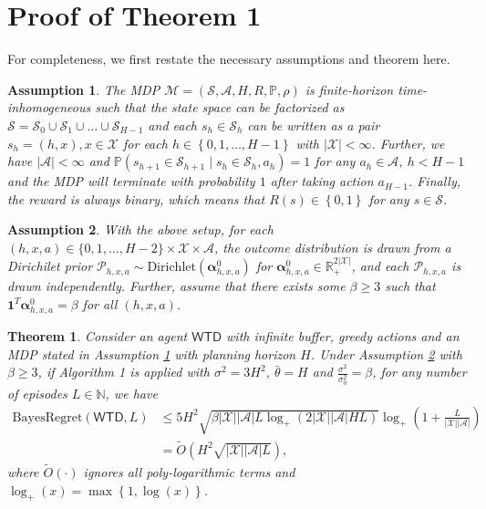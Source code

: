 \documentclass[letterpaper]{article} %
\newcommand{\Sp}[1]{\left(#1\right)}
\newcommand{\Bp}[1]{\left\{#1\right\}}
\newcommand{\abs}[1]{\left|#1\right|}
\newcommand{\Prob}{\mathbb{P}}
\newcommand{\R}{\mathbb{R}}
\newtheorem{theorem}{Theorem}
\newtheorem{assumption}{Assumption}
\theoremstyle{definition}
\begin{document}
\section{Proof of Theorem 1}
For completeness, we first restate the necessary assumptions and theorem here.
\begin{assumption}
    \label{assume:mdp}
    The MDP $\mathcal{M}=\Sp{\mathcal{S}, \mathcal{A}, H, R, \Prob, \rho}$ is finite-horizon time-inhomogeneous such that the state space can be factorized as $\mathcal{S}=\mathcal{S}_0\cup\mathcal{S}_1\cup\dots\cup\mathcal{S}_{H-1}$ and each $s_h\in \mathcal{S}_h$ can be written as a pair $s_h=\Sp{h, x}, x\in\mathcal{X}$ for each $h\in\Bp{0, 1, \dots, H-1}$ with $\abs{\mathcal{X}}<\infty$. Further, we have $\abs{\mathcal{A}}<\infty$ and $\Prob\Sp{s_{h+1}\in\mathcal{S}_{h+1}\mid s_h\in\mathcal{S}_h, a_h}=1$ for any $a_h\in\mathcal{A}$, $h<H-1$ and the MDP will terminate with probability $1$ after taking action $a_{H-1}$. Finally, the reward is always binary, which means that $R\Sp{s}\in\Bp{0, 1}$ for any $s\in\mathcal{S}$.
\end{assumption}
\begin{assumption}
	\label{assume:dir}
	With the above setup, for each $(h, x, a) \in \{0, 1, \dots, H - 2\} \times \mathcal{X} \times \mathcal{A}$, the outcome distribution is drawn from a Dirichilet prior $\mathcal{P}_{h, x, a}\sim\mathrm{Dirichlet}\Sp{\bm{\alpha}^0_{h, x, a}}$ for $\bm{\alpha}^0_{h, x, a} \in \R_{+}^{2 \abs{\mathcal{X}}}$, and each $\mathcal{P}_{h, x, a}$ is drawn independently. Further, assume that there exists some $\beta\geq 3$ such that $\bm{1}^T\bm{\alpha}^0_{h, x, a}=\beta$ for all $\Sp{h, x, a}$. 
\end{assumption}
\begin{theorem}
	\label{theo:regret}
	Consider an agent $\mathsf{WTD}$ with infinite buffer, greedy actions and an MDP stated in Assumption \ref{assume:mdp} with planning horizon $H$. Under Assumption \ref{assume:dir} with $\beta\geq 3$, if Algorithm 1 is applied with $\sigma^2=3H^2$, $\bar{\theta}=H$ and $\frac{\sigma^2}{\sigma_0^2}=\beta$, for any number of episodes $L\in\mathbb{N}$, we have
	\begin{align*}
	\mathrm{BayesRegret}\Sp{\mathsf{WTD}, L}&\leq 5H^2\sqrt{\beta\abs{\mathcal{X}}\abs{\mathcal{A}}L\log_+\Sp{2\abs{\mathcal{X}}\abs{\mathcal{A}}HL}}\log_+\Sp{1+\frac{L}{\abs{\mathcal{X}}\abs{\mathcal{A}}}}\\
	&=\widetilde{O}\Sp{H^2\sqrt{\abs{\mathcal{X}}\abs{\mathcal{A}}L}},
	\end{align*}
	where $\widetilde{O}\Sp{\cdot}$ ignores all poly-logarithmic terms and $\log_+\Sp{x}=\max\Bp{1, \log\Sp{x}}$.
\end{theorem}
\end{document}
